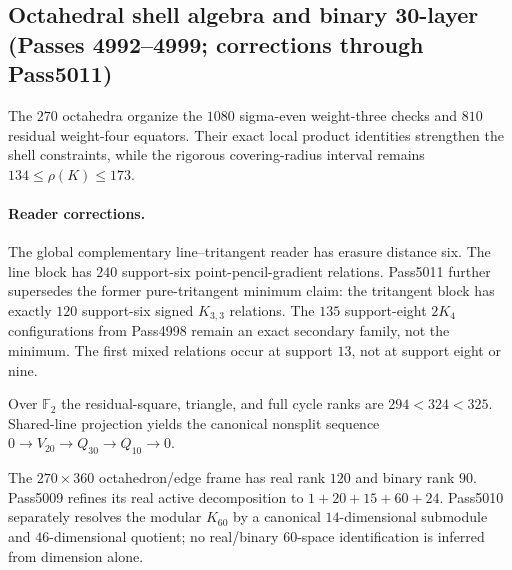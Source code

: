 \subsection*{Octahedral shell algebra and binary 30-layer (Passes 4992--4999; corrections through Pass5011)}
The $270$ octahedra organize the $1080$ sigma-even weight-three checks and $810$ residual weight-four equators.  Their exact local product identities strengthen the shell constraints, while the rigorous covering-radius interval remains $134\leq\rho(K)\leq173$.

\paragraph{Reader corrections.}
The global complementary line--tritangent reader has erasure distance six.  The line block has $240$ support-six point-pencil-gradient relations.  Pass5011 further supersedes the former pure-tritangent minimum claim: the tritangent block has exactly $120$ support-six signed $K_{3,3}$ relations.  The $135$ support-eight $2K_4$ configurations from Pass4998 remain an exact secondary family, not the minimum.  The first mixed relations occur at support $13$, not at support eight or nine.

Over $\mathbb F_2$ the residual-square, triangle, and full cycle ranks are $294<324<325$.  Shared-line projection yields the canonical nonsplit sequence $0\to V_{20}\to Q_{30}\to Q_{10}\to0$.

The $270\times360$ octahedron/edge frame has real rank $120$ and binary rank $90$.  Pass5009 refines its real active decomposition to $1+20+15+60+24$.  Pass5010 separately resolves the modular $K_{60}$ by a canonical $14$-dimensional submodule and $46$-dimensional quotient; no real/binary $60$-space identification is inferred from dimension alone.
